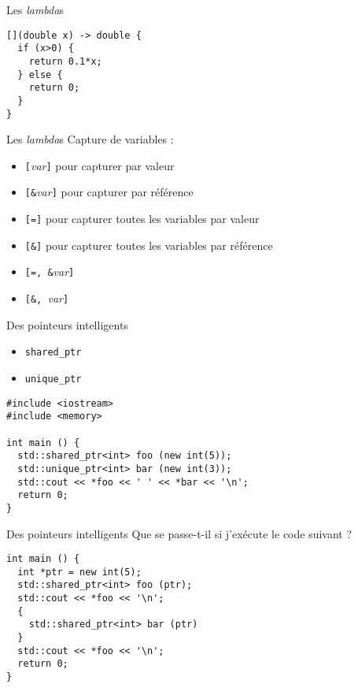 \begin{frame}[fragile]{{Les \textit{lambda}s}}
  \begin{lstlisting}
[](double x) -> double {
  if (x>0) {
    return 0.1*x;
  } else {
    return 0;
  }
}
  \end{lstlisting}
\end{frame}

\begin{frame}{{Les \textit{lambda}s}}
  Capture de variables :
  \begin{itemize}
  \item \texttt{[}\textit{var}\texttt{]} pour capturer par valeur
  \item \texttt{[\&}\textit{var}\texttt{]} pour capturer par référence
  \item \texttt{[=]} pour capturer toutes les variables par valeur
  \item \texttt{[\&]} pour capturer toutes les variables par référence
  \item \texttt{[=, \&}\textit{var}\texttt{]}
  \item \texttt{[\&, }\textit{var}\texttt{]}
  \end{itemize}
\end{frame}

\begin{frame}[fragile]{Des pointeurs intelligents}
  \begin{itemize}
  \item \texttt{shared\_ptr}
  \item \texttt{unique\_ptr}
  \end{itemize}

  \begin{lstlisting}
#include <iostream>
#include <memory>

int main () {
  std::shared_ptr<int> foo (new int(5));
  std::unique_ptr<int> bar (new int(3));
  std::cout << *foo << ' ' << *bar << '\n';
  return 0;
}
  \end{lstlisting}
\end{frame}

\begin{frame}[fragile]{Des pointeurs intelligents}
  Que se passe-t-il si j'exécute le code suivant ?

  \begin{lstlisting}
int main () {
  int *ptr = new int(5);
  std::shared_ptr<int> foo (ptr);
  std::cout << *foo << '\n';
  {
    std::shared_ptr<int> bar (ptr)
  }
  std::cout << *foo << '\n';
  return 0;
}
  \end{lstlisting}
\end{frame}

